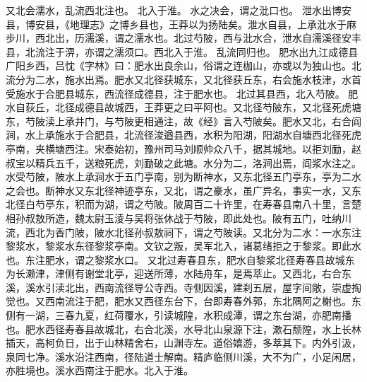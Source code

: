 \documentclass[12pt,UTF8]{ctexbook}
\begin{document}
又北会濡水，乱流西北注也。
北入于淮。
水之决会，谓之沘口也。
泄水出博安县，博安县，《地理志》之博乡县也，王莽以为扬陆矣。泄水自县，上承沘水于麻步川，西北出，历濡溪，谓之濡水也。北过芍陂，西与沘水合，泄水自濡溪径安丰县，北流注于淠，亦谓之濡须口。西北入于淮。
乱流同归也。
肥水出九江成德县广阳乡西，吕忱《字林》曰：肥水出良余山，俗谓之连枷山，亦或以为独山也。北流分为二水，施水出焉。肥水又北径获城东，又北径获丘东，右会施水枝津，水首受施水于合肥县城东，西流径成德县，注于肥水也。
北过其县西，北入芍陂。
肥水自荻丘，北径成德县故城西，王莽更之曰平阿也。又北径芍陂东，又北径死虎塘东，芍陂渎上承井门，与芍陂更相通注，故《经》言入芍陂矣。肥水又北，右合阎涧，水上承施水于合肥县，北流径浚遒县西，水积为阳湖，阳湖水自塘西北径死虎亭南，夹横塘西注。宋泰始初，豫州司马刘顺帅众八千，据其城地。以拒刘勔，赵叔宝以精兵五千，送粮死虎，刘勔破之此塘。水分为二，洛涧出焉，阎浆水注之。水受芍陂，陂水上承涧水于五门亭南，别为断神水，又东北径五门亭东，亭为二水之会也。断神水又东北径神迹亭东，又北，谓之豪水，虽广异名，事实一水，又东北径白芍亭东，积而为湖，谓之芍陂。陂周百二十许里，在寿春县南八十里，言楚相孙叔敖所造，魏太尉玉淩与吴将张休战于芍陂，即此处也。陂有五门，吐纳川流，西北为香门陂，陂水北径孙叔敖祠下，谓之芍陂读。又北分为二水：一水东注黎浆水，黎浆水东径黎浆亭南。文钦之叛，吴军北入，诸葛绪拒之于黎浆。即此水也。东注肥水，谓之黎浆水口。
又北过寿春县东，肥水自黎浆北径寿春县故城东为长濑津，津侧有谢堂北亭，迎送所薄，水陆舟车，是焉萃止。又西北，右合东溪，溪水引渎北出，西南流径导公寺西。寺侧因溪，建刹五层，屋字间敞，崇虚掏觉也。又西南流注于肥，肥水又西径东台下，台即寿春外郭，东北隅阿之榭也。东侧有一湖，三春九夏，红荷覆水，引读城隍，水积成潭，谓之东台湖，亦肥南播也。肥水西径寿春县故城北，右合北溪，水导北山泉源下注，漱石颓隍，水上长林插天，高柯负日，出于山林精舍右，山渊寺左。道俗嬉游，多萃其下。内外引汲，泉同七净。溪水沿注西南，径陆道士解南。精庐临侧川溪，大不为广，小足闲居，亦胜境也。溪水西南注于肥水。北入于淮。
\end{document}
